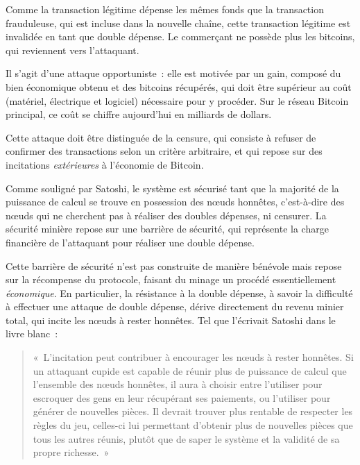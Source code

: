 Comme la transaction légitime dépense les mêmes fonds que la transaction frauduleuse, qui est incluse dans la nouvelle chaîne, cette transaction légitime est invalidée en tant que double dépense. Le commerçant ne possède plus les bitcoins, qui reviennent vers l'attaquant.

Il s'agit d'une attaque opportuniste~: elle est motivée par un gain, composé du bien économique obtenu et des bitcoins récupérés, qui doit être supérieur au coût (matériel, électrique et logiciel) nécessaire pour y procéder. Sur le réseau Bitcoin principal, ce coût se chiffre aujourd'hui en milliards de dollars.

Cette attaque doit être distinguée de la censure, qui consiste à refuser de confirmer des transactions selon un critère arbitraire, et qui repose sur des incitations \emph{extérieures} à l'économie de Bitcoin.


Comme souligné par Satoshi, le système est sécurisé tant que la majorité de la puissance de calcul se trouve en possession des nœuds honnêtes, c'est-à-dire des nœuds qui ne cherchent pas à réaliser des doubles dépenses, ni censurer. La sécurité minière repose sur une barrière de sécurité, qui représente la charge financière de l'attaquant pour réaliser une double dépense.

Cette barrière de sécurité n'est pas construite de manière bénévole mais repose sur la récompense du protocole, faisant du minage un procédé essentiellement \emph{économique}. En particulier, la résistance à la double dépense, à savoir la difficulté à effectuer une attaque de double dépense, dérive directement du revenu minier total, qui incite les nœuds à rester honnêtes. Tel que l'écrivait Satoshi dans le livre blanc~:

\begin{quote}
«~L'incitation peut contribuer à encourager les nœuds à rester honnêtes. Si un attaquant cupide est capable de réunir plus de puissance de calcul que l'ensemble des nœuds honnêtes, il aura à choisir entre l'utiliser pour escroquer des gens en leur récupérant ses paiements, ou l'utiliser pour générer de nouvelles pièces. Il devrait trouver plus rentable de respecter les règles du jeu, celles-ci lui permettant d'obtenir plus de nouvelles pièces que tous les autres réunis, plutôt que de saper le système et la validité de sa propre richesse.~»
\end{quote}

